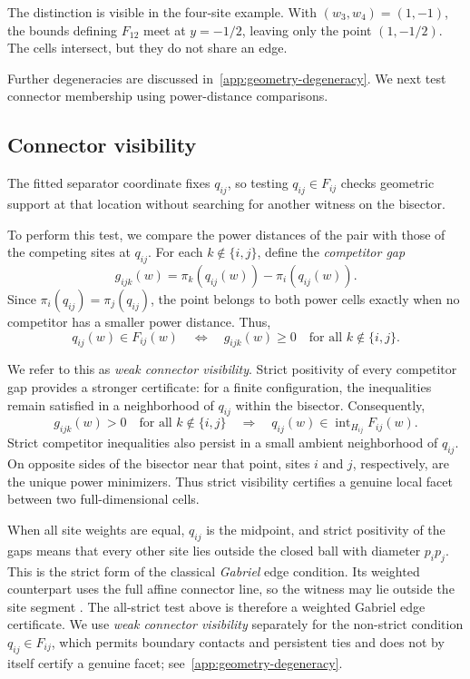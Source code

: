 The distinction is visible in the four-site example. With $(w_3,w_4)=(1,-1)$, the bounds defining $F_{12}$ meet at $y=-1/2$, leaving only the point $(1,-1/2)$. The cells intersect, but they do not share an edge.

Further degeneracies are discussed in~\ref{app:geometry-degeneracy}. We next test connector membership using power-distance comparisons.

\subsection{Connector visibility}
\label{subsec:connector-visibility}

The fitted separator coordinate fixes $q_{ij}$, so testing $q_{ij}\in F_{ij}$ checks geometric support at that location without searching for another witness on the bisector.

To perform this test, we compare the power distances of the pair with those of the competing sites at $q_{ij}$. For each $k\notin\{i,j\}$, define the \emph{competitor gap}
\begin{equation}
g_{ijk}(w)=\pi_k(q_{ij}(w))-\pi_i(q_{ij}(w)).
\label{eq:competitor-gap}
\end{equation}
Since $\pi_i(q_{ij})=\pi_j(q_{ij})$, the point belongs to both power cells exactly when no competitor has a smaller power distance. Thus,
\begin{equation}
\boxed{q_{ij}(w)\in F_{ij}(w)
\quad\Longleftrightarrow\quad
g_{ijk}(w)\ge0
\quad\text{for all }k\notin\{i,j\}.}
\label{eq:weak-connector-visibility}
\end{equation}

We refer to this as \emph{weak connector visibility}. Strict positivity of every competitor gap provides a stronger certificate: for a finite configuration, the inequalities remain satisfied in a neighborhood of $q_{ij}$ within the bisector. Consequently,
\begin{equation}
g_{ijk}(w)>0\quad\text{for all }k\notin\{i,j\}
\quad\Longrightarrow\quad
q_{ij}(w)\in\operatorname{int}_{H_{ij}}F_{ij}(w).
\label{eq:strict-connector-visibility}
\end{equation}
Strict competitor inequalities also persist in a small ambient neighborhood of $q_{ij}$. On opposite sides of the bisector near that point, sites $i$ and $j$, respectively, are the unique power minimizers. Thus strict visibility certifies a genuine local facet between two full-dimensional cells.

When all site weights are equal, $q_{ij}$ is the midpoint, and strict positivity of the gaps means that every other site lies outside the closed ball with diameter $p_ip_j$. This is the strict form of the classical \emph{Gabriel} edge condition. Its weighted counterpart uses the full affine connector line, so the witness may lie outside the site segment \citep[Sec.~2]{Alexa2020}. The all-strict test above is therefore a weighted Gabriel edge certificate. We use \emph{weak connector visibility} separately for the non-strict condition $q_{ij}\in F_{ij}$, which permits boundary contacts and persistent ties and does not by itself certify a genuine facet; see~\ref{app:geometry-degeneracy}.

